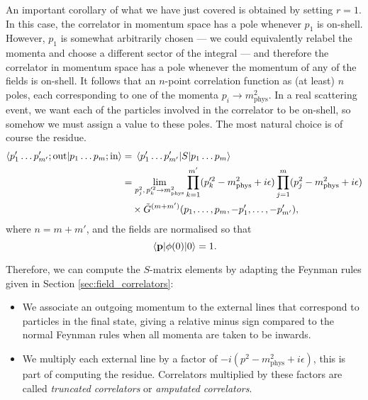 \documentclass{article}
\numberwithin{equation}{section}
\begin{document}
An important corollary of what we have just covered is obtained by setting $r=1$. In this case, the correlator in momentum space has a pole whenever $p_1$ is on-shell. However, $p_1$ is somewhat arbitrarily chosen --- we could equivalently relabel the momenta and choose a different sector of the integral --- and therefore the correlator in momentum space has a pole whenever the momentum of any of the fields is on-shell. It follows that an $n$-point correlation function as (at least) $n$ poles, each corresponding to one of the momenta $p_i \rightarrow m_{\text{phys}}^2$. In a real scattering event, we want each of the particles involved in the correlator to be on-shell, so somehow we must assign a value to these poles. The most natural choice is of course the residue. 
\begin{equation}
\begin{aligned}
    \braket{p'_1 \dots p'_{m'}; \text{out}}{p_1 \dots p_m; \text{in}} &= \mel{p'_1 \dots p'_{m'}}{S}{p_1 \dots p_m} \\
    &= \lim_{p_j^2, \, p_k^{\prime 2} \rightarrow m_{\text{phys}}^2} \prod_{k=1}^{m'} (p_k^{\prime 2} - m_{\text{phys}}^2 + i\epsilon) \prod_{j=1}^{m} (p_j^2 - m_{\text{phys}}^2 + i\epsilon) \\
    & \quad \times \tilde{G}^{(m+m')} (p_1, \dots, p_m, -p'_1, \dots, -p'_{m'}),
\end{aligned}
\end{equation}  
where $n=m + m'$, and the fields are normalised so that
\begin{equation}
    \mel{\vb{p}}{\phi(0)}{0} = 1.
\end{equation}

Therefore, we can compute the $S$-matrix elements by adapting the Feynman rules given in Section \ref{sec:field_correlators}:
\begin{itemize}
    \item We associate an outgoing momentum to the external lines that correspond to particles in the final state, giving a relative minus sign compared to the normal Feynman rules when all momenta are taken to be inwards. 
    \item We multiply each external line by a factor of $-i(p^2 - m_{\text{phys}}^2 + i\epsilon)$, this is part of computing the residue. Correlators multiplied by these factors are called \textit{truncated correlators} or \textit{amputated correlators}. %
\end{itemize}
\end{document}
